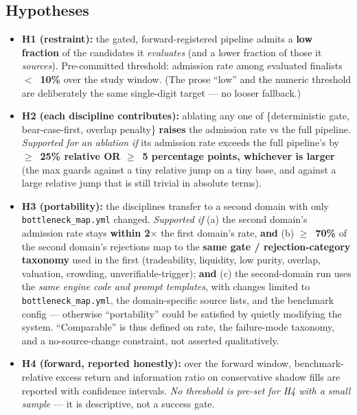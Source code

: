 \documentclass[11pt]{article}
\begin{document}
\subsection*{Hypotheses}

\begin{itemize}
  \item \textbf{H1 (restraint):} the gated, forward-registered pipeline admits a \textbf{low
    fraction} of the candidates it \emph{evaluates} (and a lower fraction of those it
    \emph{sources}). Pre-committed threshold: admission rate among evaluated finalists
    \textbf{$<$~10\%} over the study window. (The prose ``low'' and the numeric threshold are
    deliberately the same single-digit target --- no looser fallback.)

  \item \textbf{H2 (each discipline contributes):} ablating any one of \{deterministic gate,
    bear-case-first, overlap penalty\} \textbf{raises} the admission rate vs the full pipeline.
    \emph{Supported for an ablation if} its admission rate exceeds the full pipeline's by
    \textbf{$\geq$~25\% relative OR $\geq$~5 percentage points, whichever is larger} (the max
    guards against a tiny relative jump on a tiny base, and against a large relative jump that is
    still trivial in absolute terms).

  \item \textbf{H3 (portability):} the disciplines transfer to a second domain with only
    \texttt{bottleneck\_map.yml} changed. \emph{Supported if} (a) the second domain's admission
    rate stays \textbf{within 2$\times$} the first domain's rate, \textbf{and} (b)
    \textbf{$\geq$~70\%} of the second domain's rejections map to the \textbf{same gate /
    rejection-category taxonomy} used in the first (tradeability, liquidity, low purity, overlap,
    valuation, crowding, unverifiable-trigger); \textbf{and} (c) the second-domain run uses the
    \emph{same engine code and prompt templates}, with changes limited to
    \texttt{bottleneck\_map.yml}, the domain-specific source lists, and the benchmark config ---
    otherwise ``portability'' could be satisfied by quietly modifying the system. ``Comparable'' is
    thus defined on rate, the failure-mode taxonomy, and a no-source-change constraint, not asserted
    qualitatively.

  \item \textbf{H4 (forward, reported honestly):} over the forward window, benchmark-relative
    excess return and information ratio on conservative shadow fills are reported with confidence
    intervals. \emph{No threshold is pre-set for H4 with a small sample} --- it is descriptive,
    not a success gate.


\end{itemize}
\end{document}
